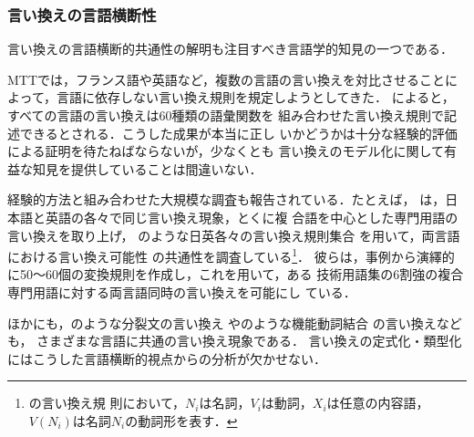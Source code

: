\subsubsection{言い換えの言語横断性}

言い換えの言語横断的共通性の解明も注目すべき言語学的知見の一つである．

MTTでは，フランス語や英語など，複数の言語の言い換えを対比させることに
よって，言語に依存しない言い換え規則を規定しようとしてきた．
によると，すべての言語の言い換えは60種類の語彙関数を
組み合わせた言い換え規則で記述できるとされる．こうした成果が本当に正し
いかどうかは十分な経験的評価による証明を待たねばならないが，少なくとも
言い換えのモデル化に関して有益な知見を提供していることは間違いない．

経験的方法と組み合わせた大規模な調査も報告されている．たとえば，
は，日本語と英語の各々で同じ言い換え現象，とくに複
合語を中心とした専門用語の言い換えを取り上げ，
のような日英各々の言い換え規則集合
\cite{jacquemin:97,yoshikane:03}を用いて，両言語における言い換え可能性
の共通性を調査している\footnote{の言い換え規
則において，$N_{i}$は名詞，$V_{i}$は動詞，$X_{i}$は任意の内容語，
$V(N_{i})$は名詞$N_{i}$の動詞形を表す．}．
彼らは，事例から演繹的に50〜60個の変換規則を作成し，これを用いて，ある
技術用語集の6割強の複合専門用語に対する両言語同時の言い換えを可能にし
ている．

ほかにも，のような分裂文の言い換え
\cite{sunagawa:95,dras:99:a}やのような機能動詞結合
の言い換え\cite{muraki:91,iordanskaja:91,dras:99:a,fujita:04:d}なども，
さまざまな言語に共通の言い換え現象である．
言い換えの定式化・類型化にはこうした言語横断的視点からの分析が欠かせない．

